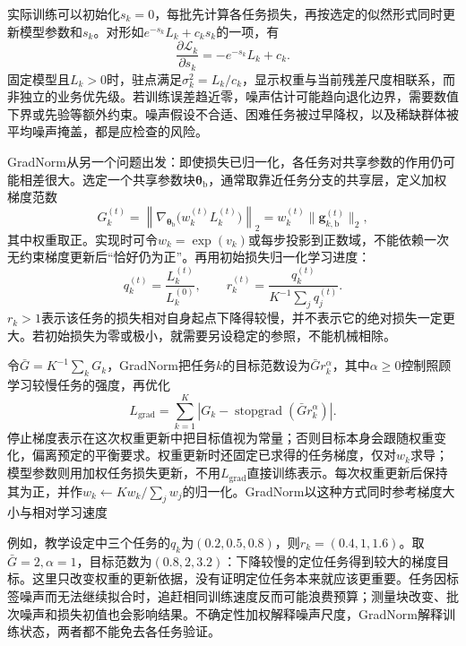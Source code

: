 实际训练可以初始化$s_k=0$，每批先计算各任务损失，再按选定的似然形式同时更新模型参数和$s_k$。对形如$e^{-s_k}L_k+c_ks_k$的一项，有
\begin{equation}
  \frac{\partial\mathcal L_k}{\partial s_k}
  =-e^{-s_k}L_k+c_k.
\end{equation}
固定模型且$L_k>0$时，驻点满足$\sigma_k^2=L_k/c_k$，显示权重与当前残差尺度相联系，而非独立的业务优先级。若训练误差趋近零，噪声估计可能趋向退化边界，需要数值下界或先验等额外约束。噪声假设不合适、困难任务被过早降权，以及稀缺群体被平均噪声掩盖，都是应检查的风险。

GradNorm从另一个问题出发：即使损失已归一化，各任务对共享参数的作用仍可能相差很大。选定一个共享参数块$\bm{\theta}_{\mathrm b}$，通常取靠近任务分支的共享层，定义加权梯度范数
\begin{equation}
  G_k^{(t)}
  =\left\|\nabla_{\bm{\theta}_{\mathrm b}}
     \bigl(w_k^{(t)}L_k^{(t)}\bigr)\right\|_2
  =w_k^{(t)}\|\bm g_{k,\mathrm b}^{(t)}\|_2,
  \label{eq:ket-sharing-gradnorm-size}
\end{equation}
其中权重取正。实现时可令$w_k=\exp(v_k)$或每步投影到正数域，不能依赖一次无约束梯度更新后“恰好仍为正”。再用初始损失归一化学习进度：
\begin{equation}
  q_k^{(t)}=\frac{L_k^{(t)}}{L_k^{(0)}},
  \qquad
  r_k^{(t)}
  =\frac{q_k^{(t)}}{K^{-1}\sum_jq_j^{(t)}}.
  \label{eq:ket-sharing-gradnorm-rate}
\end{equation}
$r_k>1$表示该任务的损失相对自身起点下降得较慢，并不表示它的绝对损失一定更大。若初始损失为零或极小，就需要另设稳定的参照，不能机械相除。

令$\bar G=K^{-1}\sum_kG_k$，GradNorm把任务$k$的目标范数设为$\bar G r_k^\alpha$，其中$\alpha\geq0$控制照顾学习较慢任务的强度，再优化
\begin{equation}
  L_{\mathrm{grad}}
  =\sum_{k=1}^{K}
  \left|G_k-
    \operatorname{stopgrad}(\bar G r_k^\alpha)\right|.
  \label{eq:ket-sharing-gradnorm-objective}
\end{equation}
停止梯度表示在这次权重更新中把目标值视为常量；否则目标本身会跟随权重变化，偏离预定的平衡要求。权重更新时还固定已求得的任务梯度，仅对$w_k$求导；模型参数则用加权任务损失更新，不用$L_{\mathrm{grad}}$直接训练表示。每次权重更新后保持其为正，并作$w_k\leftarrow Kw_k/\sum_jw_j$的归一化。GradNorm以这种方式同时参考梯度大小与相对学习速度

例如，教学设定中三个任务的$q_k$为$(0.2,0.5,0.8)$，则$r_k=(0.4,1,1.6)$。取$\bar G=2,\alpha=1$，目标范数为$(0.8,2,3.2)$：下降较慢的定位任务得到较大的梯度目标。这里只改变权重的更新依据，没有证明定位任务本来就应该更重要。任务因标签噪声而无法继续拟合时，追赶相同训练速度反而可能浪费预算；测量块改变、批次噪声和损失初值也会影响结果。不确定性加权解释噪声尺度，GradNorm解释训练状态，两者都不能免去各任务验证。

